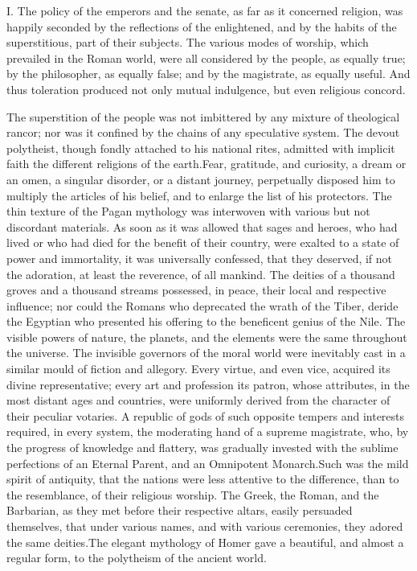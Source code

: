 
I. The policy of the emperors and the senate, as far as it
concerned religion, was happily seconded by the reflections of
the enlightened, and by the habits of the superstitious, part of
their subjects. The various modes of worship, which prevailed in
the Roman world, were all considered by the people, as equally
true; by the philosopher, as equally false; and by the
magistrate, as equally useful. And thus toleration produced not
only mutual indulgence, but even religious concord.

The superstition of the people was not imbittered by any mixture
of theological rancor; nor was it confined by the chains of any
speculative system. The devout polytheist, though fondly attached
to his national rites, admitted with implicit faith the different
religions of the earth.\footnotemark[3] Fear, gratitude, and curiosity, a dream
or an omen, a singular disorder, or a distant journey,
perpetually disposed him to multiply the articles of his belief,
and to enlarge the list of his protectors. The thin texture of
the Pagan mythology was interwoven with various but not
discordant materials. As soon as it was allowed that sages and
heroes, who had lived or who had died for the benefit of their
country, were exalted to a state of power and immortality, it was
universally confessed, that they deserved, if not the adoration,
at least the reverence, of all mankind. The deities of a thousand
groves and a thousand streams possessed, in peace, their local
and respective influence; nor could the Romans who deprecated the
wrath of the Tiber, deride the Egyptian who presented his
offering to the beneficent genius of the Nile. The visible powers
of nature, the planets, and the elements were the same throughout
the universe. The invisible governors of the moral world were
inevitably cast in a similar mould of fiction and allegory. Every
virtue, and even vice, acquired its divine representative; every
art and profession its patron, whose attributes, in the most
distant ages and countries, were uniformly derived from the
character of their peculiar votaries. A republic of gods of such
opposite tempers and interests required, in every system, the
moderating hand of a supreme magistrate, who, by the progress of
knowledge and flattery, was gradually invested with the sublime
perfections of an Eternal Parent, and an Omnipotent Monarch.\footnotemark[4]
Such was the mild spirit of antiquity, that the nations were less
attentive to the difference, than to the resemblance, of their
religious worship. The Greek, the Roman, and the Barbarian, as
they met before their respective altars, easily persuaded
themselves, that under various names, and with various
ceremonies, they adored the same deities.\footnotemark[5] The elegant mythology
of Homer gave a beautiful, and almost a regular form, to the
polytheism of the ancient world.

